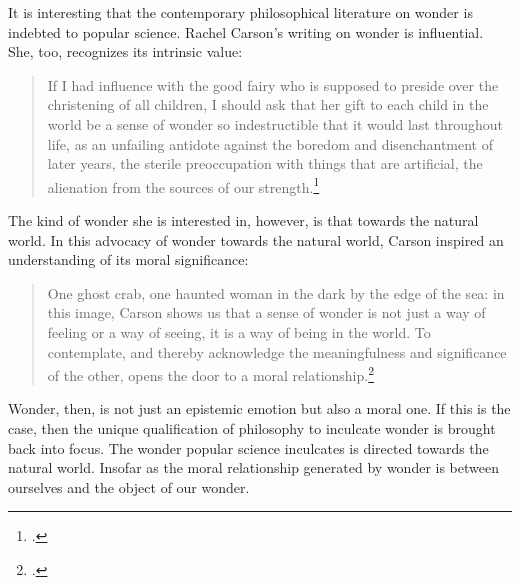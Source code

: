 \documentclass[letterpaper,notitlepage,12pt]{article}
\begin{document}
It is interesting that the contemporary philosophical literature on wonder is
indebted to popular science.
Rachel Carson's writing on wonder is influential.
She, too, recognizes its intrinsic value:
\begin{quotation}
If I  had  influence  with  the  good  fairy  who  is  supposed  to  preside
over  the christening of all children, I should ask that her gift to each child
in the world be a sense of wonder so indestructible that it would last
throughout life, as an unfailing antidote against the boredom and disenchantment
of later years, the sterile preoccupation with things that are artificial, the
alienation from the sources of our strength.\footcite[p.
46]{rachel_carson_help_nodate}
\end{quotation}
The kind of wonder she is interested in, however, is that towards the natural
world.
In this advocacy of wonder towards the natural world, Carson inspired an
understanding of its moral significance:
\begin{quotation}
  One ghost crab, one haunted woman in the dark by the edge of the sea: in
  this image, Carson shows us that a sense of wonder is not just a way of
  feeling or a way of seeing, it is a way of being in the world. To contemplate,
  and thereby acknowledge the meaningfulness and significance of the other,
  opens the door to a moral relationship.\footcite[p. 271]{moore_truth_2005}
\end{quotation}
Wonder, then, is not just an epistemic emotion but also a moral one.
If this is the case, then the unique qualification of philosophy to inculcate
wonder is brought back into focus.
The wonder popular science inculcates is directed towards the natural world.
Insofar as the moral relationship generated by wonder is between ourselves and
the object of our wonder.
\end{document}
